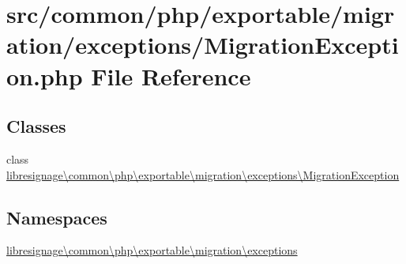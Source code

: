 \hypertarget{MigrationException_8php}{}\section{src/common/php/exportable/migration/exceptions/\+Migration\+Exception.php File Reference}
\label{MigrationException_8php}
\subsection*{Classes}
\begin{DoxyCompactItemize}
\item 
class \hyperlink{classlibresignage_1_1common_1_1php_1_1exportable_1_1migration_1_1exceptions_1_1MigrationException}{libresignage\textbackslash{}common\textbackslash{}php\textbackslash{}exportable\textbackslash{}migration\textbackslash{}exceptions\textbackslash{}\+Migration\+Exception}
\end{DoxyCompactItemize}
\subsection*{Namespaces}
\begin{DoxyCompactItemize}
\item 
 \hyperlink{namespacelibresignage_1_1common_1_1php_1_1exportable_1_1migration_1_1exceptions}{libresignage\textbackslash{}common\textbackslash{}php\textbackslash{}exportable\textbackslash{}migration\textbackslash{}exceptions}
\end{DoxyCompactItemize}
